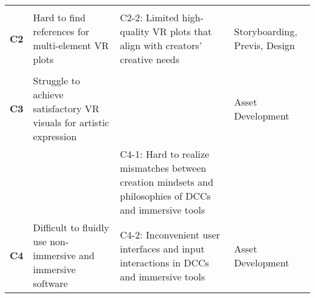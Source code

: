 \begin{table*}
\begin{tabular}{@{}lp{5.1cm}m{7.6cm}p{3.2cm}@{}}
             &               & \cellcolor[HTML]{edf5f7}{C2-1: Hard to describe and access multi-element plots based on story elements and desired outcomes}                                                                                     &                                     \\ %
                            \multirow{-3}{*}{\textbf{C2}}    &    \multirow{-3}{*}{\parbox{4.5cm}{Hard to find references for multi-element VR plots}}                                                                                     & {C2-2: Limited high-quality VR plots that align with creators' creative needs}                                                               &     \multirow{-2.5}{*}{\parbox{3.2cm}{Storyboarding, Previs, Design}}                                                                                        \\ \hline
                                       &       &  \cellcolor[HTML]{edf5f7}{C3-1: Difficult to plan and manage visual details under VR’s real-time performance constraints}                                                                                                   &                                             \\ %
                            \multirow{-3}{*}{\textbf{C3}}      &    \multirow{-3}{*}{\parbox{4.5cm}{Struggle to achieve satisfactory VR visuals for artistic expression}}                                                                                    &  \cellcolor[HTML]{edf5f7}{C3-2: Hard to achieve professional-grade visual quality with immersive tools alone}     &            \multirow{-3}{*}{Asset Development}                                                                                     \\ \hline
         &              & {C4-1: Hard to realize mismatches between creation mindsets and philosophies of DCCs and immersive tools}                                            &                                                   \\ %
                             \multirow{-3}{*}{\textbf{C4}}   &   \multirow{-3}{*}{\parbox{4.5cm}{Difficult to fluidly use non-immersive and immersive software}}                                                                               &  {C4-2: Inconvenient user interfaces and input interactions in DCCs and immersive tools}                                                                                    &     \multirow{-3}{*}{Asset Development}                                                                                  \\ \hline


\end{tabular}
\end{table*}
